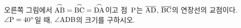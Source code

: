 \noindent\begin{minipage}[t]{0.58\linewidth}\vspace{0pt}\raggedright 오른쪽 그림에서 $\overset{\frown}{\mathrm{AB}}=\overset{\frown}{\mathrm{BC}}=\overset{\frown}{\mathrm{DA}}$이고 점~$\mathrm{P}$는 $\overline{\mathrm{AD}}$, $\overline{\mathrm{BC}}$의 연장선의 교점이다. $\angle\mathrm{P}=40^\circ$일 때, $\angle\mathrm{ADB}$의 크기를 구하시오.\end{minipage}\hfill\begin{minipage}[t]{0.4\linewidth}\vspace{0pt}\centering \resizebox{\ifdim\width>\linewidth\linewidth\else\width\fi}{!}{}\end{minipage}\par

